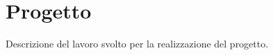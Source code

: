 \chapter{Progetto}\label{chap:Progetto}
Descrizione del lavoro svolto per la realizzazione del progetto.




